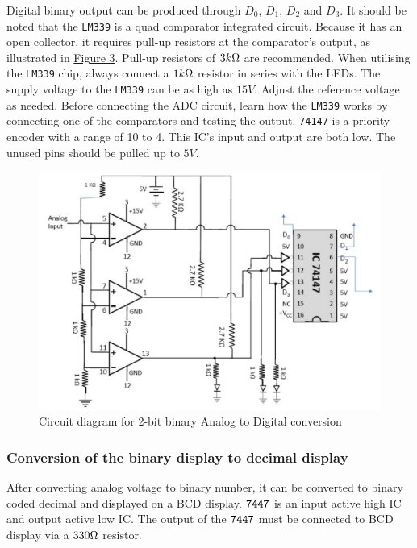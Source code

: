 Digital binary output can be produced through $D_0$, $D_1$, $D_2$ and $D_3$. It should be noted that the \verb|LM339| is a quad comparator integrated circuit. Because it has an open collector, it requires pull-up resistors at the comparator's output, as illustrated in \hyperref[obj:2]{Figure 3}. Pull-up resistors of $3k\ohm$ are recommended. When utilising the \verb|LM339| chip, always connect a $1k\ohm$ resistor in series with the LEDs. The supply voltage to the \verb|LM339| can be as high as $15V$. Adjust the reference voltage as needed. Before connecting the ADC circuit, learn how the \verb|LM339| works by connecting one of the comparators and testing the output. \verb|74147| is a priority encoder with a range of 10 to 4. This IC's input and output are both low. The unused pins should be pulled up to $5V$.
\begin{figure}[H]
    \centering
    \includegraphics[width=1\columnwidth]{images/th2.png}
    \caption{ Circuit diagram for 2-bit binary Analog to Digital conversion }
    \label{obj:2}
\end{figure}

\subsubsection*{Conversion of the binary display to decimal display}
After converting analog voltage to binary number, it can be converted to binary coded decimal and displayed on a BCD display. $\verb|7447|$ is an input active high IC and output active low IC. The output of the $\verb|7447|$ must be connected to BCD display via a $330\ohm$ resistor.